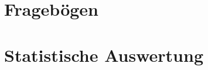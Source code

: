 \appendix
{}\label{chap.Anhang}
\setcounter{section}{0}
\section{Fragebögen}


\section{Statistische Auswertung}

